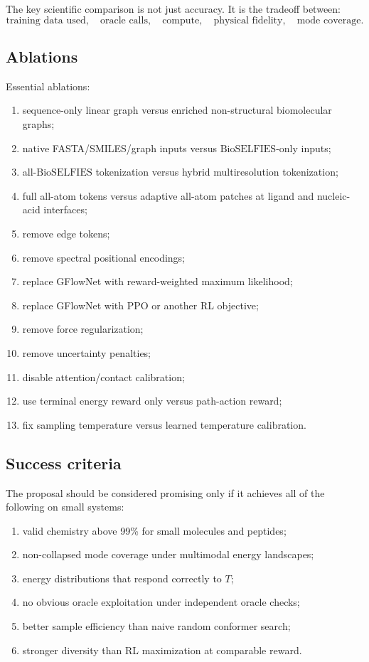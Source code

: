 \documentclass[11pt]{article}
\newcommand{\bioselfies}{\mathrm{BioSELFIES}}
\begin{document}
The key scientific comparison is not just accuracy. It is the tradeoff between:
\[
\text{training data used},\quad
\text{oracle calls},\quad
\text{compute},\quad
\text{physical fidelity},\quad
\text{mode coverage}.
\]

\subsection{Ablations}

Essential ablations:
\begin{enumerate}[leftmargin=2em]
  \item sequence-only linear graph versus enriched non-structural biomolecular graphs;
  \item native FASTA/SMILES/graph inputs versus $\bioselfies$-only inputs;
  \item all-$\bioselfies$ tokenization versus hybrid multiresolution tokenization;
  \item full all-atom tokens versus adaptive all-atom patches at ligand and nucleic-acid interfaces;
  \item remove edge tokens;
  \item remove spectral positional encodings;
  \item replace GFlowNet with reward-weighted maximum likelihood;
  \item replace GFlowNet with PPO or another RL objective;
  \item remove force regularization;
  \item remove uncertainty penalties;
  \item disable attention/contact calibration;
  \item use terminal energy reward only versus path-action reward;
  \item fix sampling temperature versus learned temperature calibration.
\end{enumerate}

\subsection{Success criteria}

The proposal should be considered promising only if it achieves all of the following on small systems:
\begin{enumerate}[leftmargin=2em]
  \item valid chemistry above 99\% for small molecules and peptides;
  \item non-collapsed mode coverage under multimodal energy landscapes;
  \item energy distributions that respond correctly to $T$;
  \item no obvious oracle exploitation under independent oracle checks;
  \item better sample efficiency than naive random conformer search;
  \item stronger diversity than RL maximization at comparable reward.
\end{enumerate}
\end{document}
